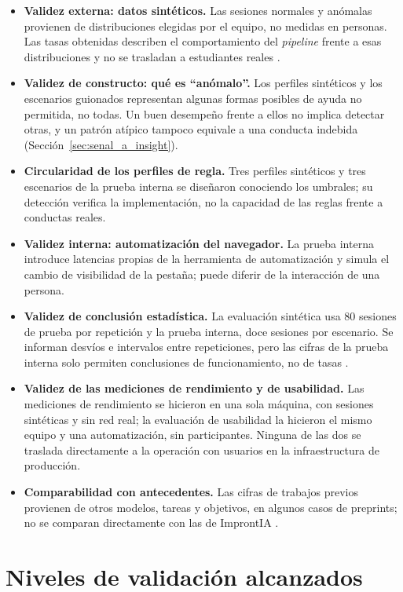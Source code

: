 \begin{itemize}
    \item \textbf{Validez externa: datos sintéticos.} Las sesiones normales y anómalas provienen de distribuciones elegidas por el equipo, no medidas en personas. Las tasas obtenidas describen el comportamiento del \textit{pipeline} frente a esas distribuciones y no se trasladan a estudiantes reales \parencite{Emmott2013}.
    \item \textbf{Validez de constructo: qué es ``anómalo''.} Los perfiles sintéticos y los escenarios guionados representan algunas formas posibles de ayuda no permitida, no todas. Un buen desempeño frente a ellos no implica detectar otras, y un patrón atípico tampoco equivale a una conducta indebida (Sección~\ref{sec:senal_a_insight}).
    \item \textbf{Circularidad de los perfiles de regla.} Tres perfiles sintéticos y tres escenarios de la prueba interna se diseñaron conociendo los umbrales; su detección verifica la implementación, no la capacidad de las reglas frente a conductas reales.
    \item \textbf{Validez interna: automatización del navegador.} La prueba interna introduce latencias propias de la herramienta de automatización y simula el cambio de visibilidad de la pestaña; puede diferir de la interacción de una persona.
    \item \textbf{Validez de conclusión estadística.} La evaluación sintética usa 80 sesiones de prueba por repetición y la prueba interna, doce sesiones por escenario. Se informan desvíos e intervalos entre repeticiones, pero las cifras de la prueba interna solo permiten conclusiones de funcionamiento, no de tasas \parencite{Varoquaux2018}.
    \item \textbf{Validez de las mediciones de rendimiento y de usabilidad.} Las mediciones de rendimiento se hicieron en una sola máquina, con sesiones sintéticas y sin red real; la evaluación de usabilidad la hicieron el mismo equipo y una automatización, sin participantes. Ninguna de las dos se traslada directamente a la operación con usuarios en la infraestructura de producción.
    \item \textbf{Comparabilidad con antecedentes.} Las cifras de trabajos previos provienen de otros modelos, tareas y objetivos, en algunos casos de preprints; no se comparan directamente con las de ImprontIA \parencite{Killourhy2009, Campos2016}.
\end{itemize}

\section{Niveles de validación alcanzados}
\label{sec:eval_niveles}

